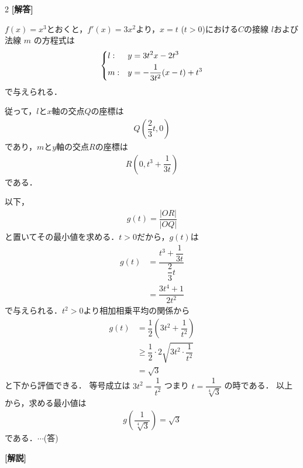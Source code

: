\documentclass[../../main.tex]{subfiles}
\begin{document}
\setcounter{equation}{0}
\begin{oframed}
  
\end{oframed}
\setlength{\columnseprule}{0.4pt}
\begin{multicols}{2}
  {\bf [解答]}

  $f(x)=x^3$とおくと，$f'(x)=3x^2$より，$x=t$ ($t>0$)における$C$の接線 $l$および法線 $m$ の方程式は
  \begin{align}
    \begin{dcases}
      l: & y = 3t^2 x - 2t^3              \\
      m: & y = -\dfrac{1}{3t^2}(x-t) + t^3
    \end{dcases}
  \end{align}
  で与えられる．

  従って，$l$と$x$軸の交点$Q$の座標は
  \begin{align}
    Q\left(\dfrac{2}{3}t, 0\right)
  \end{align}
  であり，$m$と$y$軸の交点$R$の座標は
  \begin{align}
    R\left(0, t^3+\dfrac{1}{3t}\right)
  \end{align}
  である．

  以下，
  \begin{align}
    g(t)=\dfrac{|OR|}{|OQ|}
  \end{align}
  と置いてその最小値を求める．$t>0$だから，$g(t)$は
  \begin{align}
    g(t)
    & = \dfrac{t^3+\dfrac{1}{3t}}{\dfrac{2}{3}t} \\
    & = \dfrac{3t^4+1}{2t^2}
  \end{align}
  で与えられる．$t^2>0$より相加相乗平均の関係から
  \begin{align}
    g(t)
    & = \dfrac{1}{2}\left(3t^2+\dfrac{1}{t^2}\right)            \\
    & \ge \dfrac{1}{2} \cdot 2\sqrt{3t^2 \cdot \dfrac{1}{t^2}} \\
    & = \sqrt{3}
  \end{align}
  と下から評価できる．
  等号成立は $3t^2 = \dfrac{1}{t^2}$ つまり $t = \dfrac{1}{\sqrt[4]{3}}$ の時である．
  以上から，求める最小値は
  \begin{align}
    g\left(\dfrac{1}{\sqrt[4]{3}}\right) = \sqrt{3}
  \end{align}
  である．$\cdots$(答)

  {\bf [解説]}

  \newpage
\end{multicols}
\end{document}

